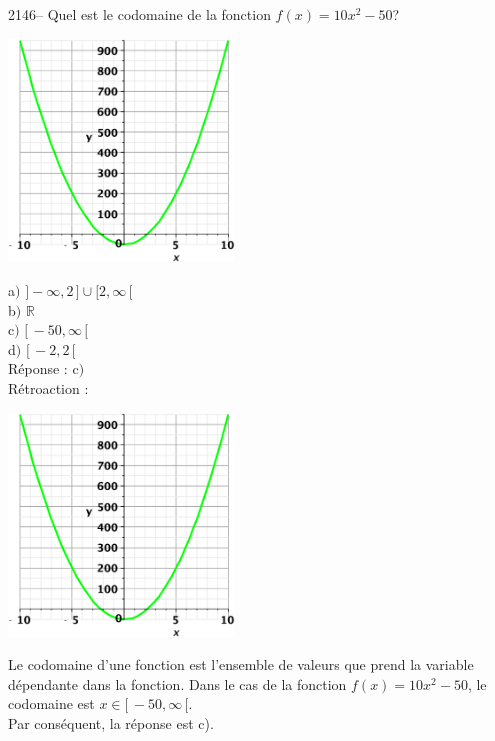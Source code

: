 \documentclass[letterpaper, 12pt]{article}
\begin{document}
2146-- Quel est le codomaine de la fonction $f(x)=10x^{2}-50$?
\begin{center}
 \includegraphics[width=6cm,bb=20 118 575 673]{Q2146.eps}
\end{center}

a$)$ $] -\infty , 2\,]\cup[2 , \infty \,[$\\[2mm]
b$)$ $\mathbb{R}$\\[2mm]
c$)$ $[\, -50 , \infty \,[$\\[2mm]
d$)$ $[\, -2 , 2 \,[$\\

R\'eponse : c$)$\\

R\'etroaction :\\
\begin{center}
 \includegraphics[width=6cm,bb=20 118 575 673]{Q2146.eps}
\end{center}
Le codomaine d'une fonction est l'ensemble de valeurs que prend la variable d\'ependante dans la fonction. Dans le cas de la fonction $f(x)=10x^{2}-50$, le codomaine est $x\in[\, -50 , \infty \,[$.\\
Par cons\'equent, la r\'eponse est c).\\
\end{document}
